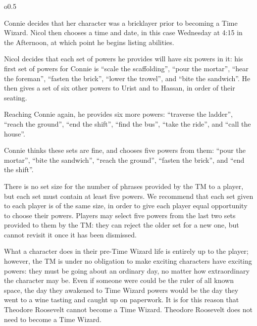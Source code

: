 \documentclass[twoside]{article}
\newenvironment{examplebox}[1]{\begin{tcolorbox}[colback=green!5!white,colframe=green!75!black,title={Example: #1}]}{\end{tcolorbox}\vspace{-30pt}}
\begin{document}
\begin{wrapfigure}{o}{0.5\textwidth}
   \vspace{-25pt}
   \begin{examplebox}{Determining Powers}
      Connie decides that her character was a bricklayer prior to becoming a Time Wizard. Nicol
      then chooses a time and date, in this case Wednesday at 4:15 in the Afternoon, at which
      point he begins listing abilities.

      Nicol decides that each set of powers he provides will have six powers in it: his first
      set of powers for Connie is ``scale the scaffolding'', ``pour the mortar'', ``hear the
      foreman'', ``fasten the brick'', ``lower the trowel'', and ``bite the sandwich''. He
      then gives a set of six other powers to Urist and to Hassan, in order of their seating.

      Reaching Connie again, he provides six more powers: ``traverse the ladder'', ``reach the
      ground'', ``end the shift'', ``find the bus'', ``take the ride'', and ``call the house''.

      Connie thinks these sets are fine, and chooses five powers from them: ``pour the mortar'',
      ``bite the sandwich'', ``reach the ground'', ``fasten the brick'', and ``end the shift''.
   \end{examplebox}
\end{wrapfigure}

There is no set size for the number of phrases provided by the TM to a player, but each set must
contain at least five powers. We recommend that each set given to each player is of the same
size, in order to give each player equal opportunity to choose their powers. Players may select
five powers from the last two sets provided to them by the TM: they can reject the older set for
a new one, but cannot revisit it once it has been dismissed.

What a character does in their pre-Time Wizard life is entirely up to the player; however, the
TM is under no obligation to make exciting characters have exciting powers: they must be
going about an ordinary day, no matter how extraordinary the character may be. Even if someone
were could be the ruler of all known space, the day they awakened to Time Wizard powers would be
the day they went to a wine tasting and caught up on paperwork. It is for this reason that
Theodore Roosevelt cannot become a Time Wizard. Theodore Roosevelt does not need to become a
Time Wizard.
\end{document}
